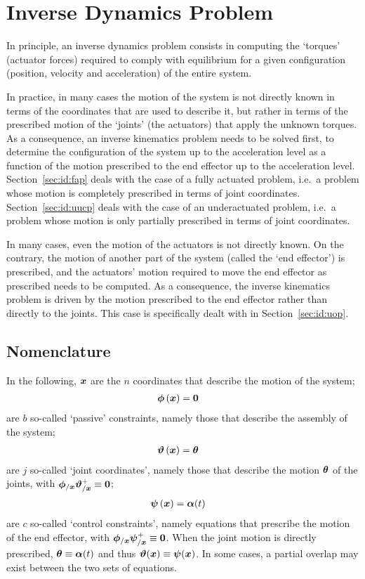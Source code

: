 \section{Inverse Dynamics Problem}
In principle, an inverse dynamics problem consists in computing the `torques'
(actuator forces) required to comply with equilibrium for a given configuration
(position, velocity and acceleration) of the entire system.

In practice, in many cases the motion of the system is not directly known
in terms of the coordinates that are used to describe it,
but rather in terms of the prescribed motion of the `joints' (the actuators)
that apply the unknown torques.
As a consequence, an inverse kinematics problem needs to be solved first,
to determine the configuration of the system up to the acceleration level
as a function of the motion prescribed to the end effector
up to the acceleration level.
Section~\ref{sec:id:fap} deals with the case of a fully actuated problem,
i.e.\ a problem whose motion is completely prescribed in terms
of joint coordinates.
Section~\ref{sec:id:uucp} deals with the case of an underactuated problem,
i.e.\ a problem whose motion is only partially prescribed in terms
of joint coordinates.

In many cases, even the motion of the actuators is not directly known.
On the contrary, the motion of another part of the system
(called the `end effector') is prescribed, and the actuators' motion
required to move the end effector as prescribed needs to be computed.
As a consequence, the inverse kinematics problem is driven
by the motion prescribed to the end effector rather than directly
to the joints.
This case is specifically dealt with in Section~\ref{sec:id:uop}.

\subsection{Nomenclature}
In the following, $\bm{x}$ are the $n$ coordinates that describe
the motion of the system;
\begin{align}
	\bm{\phi}\left( \bm{x} \right)
	&=
	\bm{0}
\end{align}
are $b$ so-called `passive' constraints, namely those that describe
the assembly of the system;
\begin{align}
	\bm{\vartheta}\left( \bm{x} \right)
	&=
	\bm{\theta}
\end{align}
are $j$ so-called `joint coordinates', namely those that describe
the motion $\bm{\theta}$ of the joints,
with $\bm{\phi}_{/\bm{x}} \bm{\vartheta}_{/\bm{x}}^+ \equiv \bm{0}$;
\begin{align}
	\bm{\psi}\left( \bm{x} \right)
	&=
	\bm{\alpha}(t)
\end{align}
are $c$ so-called `control constraints', namely equations that prescribe
the motion of the end effector,
with $\bm{\phi}_{/\bm{x}} \bm{\psi}_{/\bm{x}}^+ \equiv \bm{0}$.
When the joint motion is directly prescribed,
$\bm{\theta} \equiv \bm{\alpha}(t)$
and thus
$\bm{\vartheta}(\bm{x}) \equiv \bm{\psi}(\bm{x})$.
In some cases, a partial overlap may exist between the two sets of equations.




